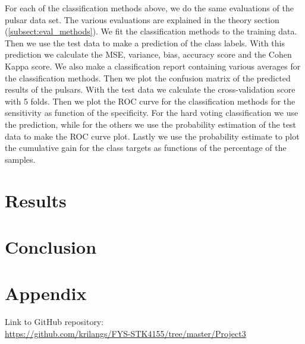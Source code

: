 \documentclass[12pt,a4paper,english]{article}
\begin{document}
For each of the classification methods above, we do the same evaluations of the pulsar data set. The various evaluations are explained in the theory section (\ref{subsect:eval_methods}). We fit the classification methods to the training data. Then we use the test data to make a prediction of the class labels. With this prediction we calculate the MSE, variance, bias, accuracy score and the Cohen Kappa score. We also make a classification report containing various averages for the classification methods. Then we plot the confusion matrix of the predicted results of the pulsars. With the test data we calculate the cross-validation score with 5 folds. Then we plot the ROC curve for the classification methods for the sensitivity as function of the specificity. For the hard voting classification we use the prediction, while for the others we use the probability estimation of the test data to make the ROC curve plot. Lastly we use the probability estimate to plot the cumulative gain for the class targets as functions of the percentage of the samples.

\section{Results}
\label{sect:Results}
\section{Conclusion}
\label{sect:Conclusion}

\appendix
\section{Appendix}
\label{sect:Appendix}
Link to GitHub repository:\\
\url{https://github.com/krilangs/FYS-STK4155/tree/master/Project3}



\end{document}
